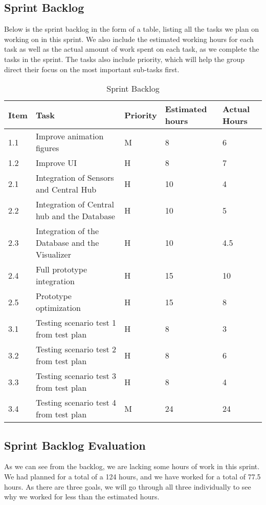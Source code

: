 \documentclass[../document]{subfiles}
\begin{document}
\subsection{Sprint Backlog}

Below is the sprint backlog in the form of a table, listing all the tasks we plan on working on in this sprint. We also include the estimated working hours for each task as well as the actual amount of work spent on each task, as we complete the tasks in the sprint. The tasks also include priority, which will help the group direct their focus on the most important sub-tasks first.

\begin{table}[H]
\caption{Sprint Backlog}
\centering
\begin{tabularx}{\textwidth}{|l|X|l|l|l|}
\hline
	Item
	&Task
	&Priority
	&Estimated hours
	&Actual Hours
	\\ \hline 1.1
	&Improve animation figures
	&M
	&8
	&6
	\\ \hline 1.2
	&Improve UI
	&H
	&8
	&7
	\\ \hline 2.1
	&Integration of Sensors and Central Hub
	&H
	&10
	&4
	\\ \hline 2.2
	&Integration of Central hub and the Database
	&H
	&10
	&5
	\\ \hline 2.3
	&Integration of the Database and the Visualizer
	&H
	&10
	&4.5
	\\ \hline 2.4
	&Full prototype integration
	&H
	&15
	&10
	\\ \hline 2.5
	&Prototype optimization
	&H
	&15
	&8
	\\ \hline 3.1
	&Testing scenario test 1 from test plan
	&H
	&8
	&3
	\\ \hline 3.2
	&Testing scenario test 2 from test plan
	&H
	&8
	&6
	\\ \hline 3.3
	&Testing scenario test 3 from test plan
	&H
	&8
	&4
	\\ \hline 3.4
	&Testing scenario test 4 from test plan
	&M
	&24\footnotemark[1]
	&24
	\\ \hline 
\end{tabularx}
\end{table}


\subsection{Sprint Backlog Evaluation}
As we can see from the backlog, we are lacking some hours of work in this sprint. We had planned for a total of a 124 hours, and we have worked for a total of 77.5 hours. As there are three goals, we will go through all three individually to see why we worked for less than the estimated hours.
\end{document}
